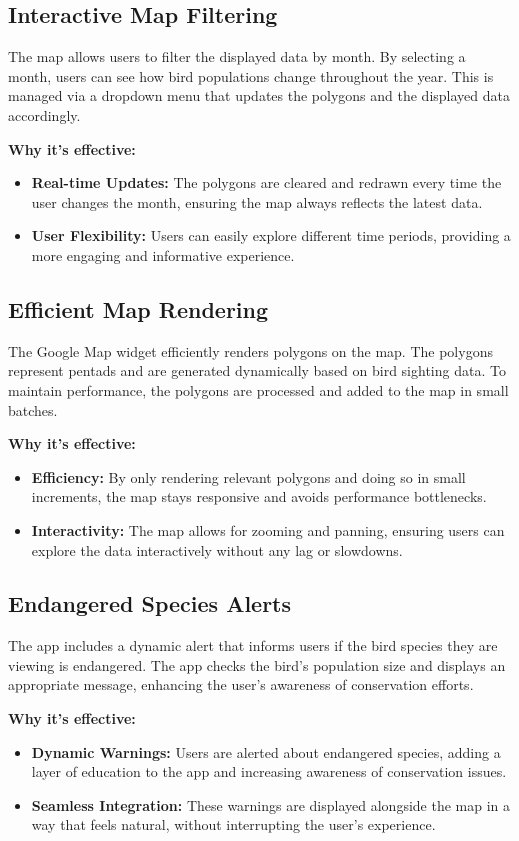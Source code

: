 \documentclass{article}
\begin{document}
\subsection{Interactive Map Filtering}
The map allows users to filter the displayed data by month. By selecting a month, users can see how bird populations change throughout the year. This is managed via a dropdown menu that updates the polygons and the displayed data accordingly.

\textbf{Why it's effective:}
\begin{itemize}
    \item \textbf{Real-time Updates:} The polygons are cleared and redrawn every time the user changes the month, ensuring the map always reflects the latest data.
    \item \textbf{User Flexibility:} Users can easily explore different time periods, providing a more engaging and informative experience.
\end{itemize}

\subsection{Efficient Map Rendering}
The Google Map widget efficiently renders polygons on the map. The polygons represent pentads and are generated dynamically based on bird sighting data. To maintain performance, the polygons are processed and added to the map in small batches.

\textbf{Why it's effective:}
\begin{itemize}
    \item \textbf{Efficiency:} By only rendering relevant polygons and doing so in small increments, the map stays responsive and avoids performance bottlenecks.
    \item \textbf{Interactivity:} The map allows for zooming and panning, ensuring users can explore the data interactively without any lag or slowdowns.
\end{itemize}

\subsection{Endangered Species Alerts}
The app includes a dynamic alert that informs users if the bird species they are viewing is endangered. The app checks the bird's population size and displays an appropriate message, enhancing the user's awareness of conservation efforts.

\textbf{Why it's effective:}
\begin{itemize}
    \item \textbf{Dynamic Warnings:} Users are alerted about endangered species, adding a layer of education to the app and increasing awareness of conservation issues.
    \item \textbf{Seamless Integration:} These warnings are displayed alongside the map in a way that feels natural, without interrupting the user's experience.
\end{itemize}
\end{document}
